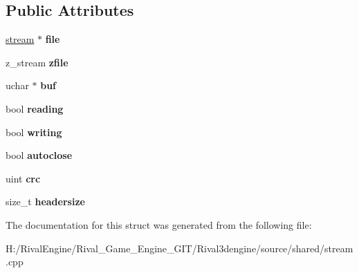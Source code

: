 \subsection*{Public Attributes}
\begin{DoxyCompactItemize}
\item 
\mbox{\label{structgzstream_a89047b896f1447130986efd6ba911bfc}} 
\hyperlink{structstream}{stream} $\ast$ {\bfseries file}
\item 
\mbox{\label{structgzstream_aa0729b97e2ad985fb251b03a97a631b1}} 
z\+\_\+stream {\bfseries zfile}
\item 
\mbox{\label{structgzstream_a3fa23c603a2059d72fad3ad5624091ae}} 
uchar $\ast$ {\bfseries buf}
\item 
\mbox{\label{structgzstream_ab7b3fb548a1d64d7ee97239ce450c836}} 
bool {\bfseries reading}
\item 
\mbox{\label{structgzstream_a22e23d033e552da74b50baf01a93ddf3}} 
bool {\bfseries writing}
\item 
\mbox{\label{structgzstream_aadb50ea1af1910707fec74525d19dc6e}} 
bool {\bfseries autoclose}
\item 
\mbox{\label{structgzstream_af29aa1e4c730531a7d75a5b755cbeaf1}} 
uint {\bfseries crc}
\item 
\mbox{\label{structgzstream_adfe5d25c1649bd8da86f4e8a7e2fe9b3}} 
size\+\_\+t {\bfseries headersize}
\end{DoxyCompactItemize}


The documentation for this struct was generated from the following file\+:\begin{DoxyCompactItemize}
\item 
H\+:/\+Rival\+Engine/\+Rival\+\_\+\+Game\+\_\+\+Engine\+\_\+\+G\+I\+T/\+Rival3dengine/source/shared/stream.\+cpp\end{DoxyCompactItemize}
